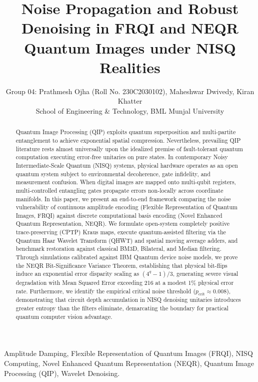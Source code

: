 \documentclass[12pt,onecolumn,draftclsnofoot]{IEEEtran}
\begin{document}
\title{Noise Propagation and Robust Denoising in FRQI and NEQR Quantum Images under NISQ Realities}

\author{Group 04: Prathmesh Ojha (Roll No. 230C2030102), Maheshwar Dwivedy, Kiran Khatter\\
School of Engineering \& Technology, BML Munjal University}

\maketitle

\begin{abstract}
Quantum Image Processing (QIP) exploits quantum superposition and multi-partite entanglement to achieve exponential spatial compression. Nevertheless, prevailing QIP literature rests almost universally upon the idealized premise of fault-tolerant quantum computation executing error-free unitaries on pure states. In contemporary Noisy Intermediate-Scale Quantum (NISQ) systems, physical hardware operates as an open quantum system subject to environmental decoherence, gate infidelity, and measurement confusion. When digital images are mapped onto multi-qubit registers, multi-controlled entangling gates propagate errors non-locally across coordinate manifolds. In this paper, we present an end-to-end framework comparing the noise vulnerability of continuous amplitude encoding (Flexible Representation of Quantum Images, FRQI) against discrete computational basis encoding (Novel Enhanced Quantum Representation, NEQR). We formulate open-system completely positive trace-preserving (CPTP) Kraus maps, execute quantum-assisted filtering via the Quantum Haar Wavelet Transform (QHWT) and spatial moving average adders, and benchmark restoration against classical BM3D, Bilateral, and Median filtering. Through simulations calibrated against IBM Quantum device noise models, we prove the NEQR Bit-Significance Variance Theorem, establishing that physical bit-flips induce an exponential error disparity scaling as $(4^q - 1)/3$, generating severe visual degradation with Mean Squared Error exceeding 216 at a modest 1\% physical error rate. Furthermore, we identify the empirical critical noise threshold ($p_{\text{crit}} \approx 0.008$), demonstrating that circuit depth accumulation in NISQ denoising unitaries introduces greater entropy than the filters eliminate, demarcating the boundary for practical quantum computer vision advantage.
\end{abstract}

\begin{IEEEkeywords}
Amplitude Damping, Flexible Representation of Quantum Images (FRQI), NISQ Computing, Novel Enhanced Quantum Representation (NEQR), Quantum Image Processing (QIP), Wavelet Denoising.
\end{IEEEkeywords}
\end{document}
